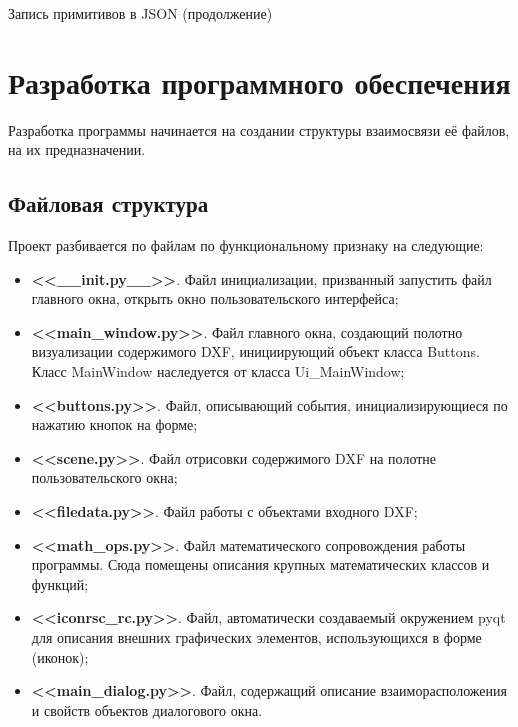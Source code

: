 \begin{algorithm}[H]
	\SetAlgoLined
	\caption{Запись примитивов в JSON (продолжение)}
	\label{alg:json1}
\end{algorithm}

\section{Разработка программного обеспечения}
Разработка программы начинается на создании структуры взаимосвязи её файлов, на их предназначении.

\subsection{Файловая структура}

Проект разбивается по файлам по функциональному признаку на следующие:
\begin{itemize}
	\item \textbf{<<\_\_init.py\_\_>>}. Файл инициализации, призванный запустить файл главного окна, открыть окно пользовательского интерфейса;
	\item \textbf{<<main\_window.py>>}. Файл главного окна, создающий полотно визуализации содержимого DXF, инициирующий объект класса Buttons. Класс MainWindow наследуется от класса Ui\_MainWindow;
	\item \textbf{<<buttons.py>>}. Файл, описывающий события, инициализирующиеся по нажатию кнопок на форме; 
	\item \textbf{<<scene.py>>}. Файл отрисовки содержимого DXF на полотне пользовательского окна;
	\item \textbf{<<filedata.py>>}. Файл работы с объектами входного DXF; 
	\item \textbf{<<math\_ops.py>>}. Файл математического сопровождения работы программы. Сюда помещены описания крупных математических классов и функций;
	\item \textbf{<<iconrsc\_rc.py>>}. Файл, автоматически создаваемый окружением pyqt для описания внешних графических элементов, использующихся в форме (иконок);
	\item \textbf{<<main\_dialog.py>>}. Файл, содержащий описание взаиморасположения и свойств объектов диалогового окна.
\end{itemize}

